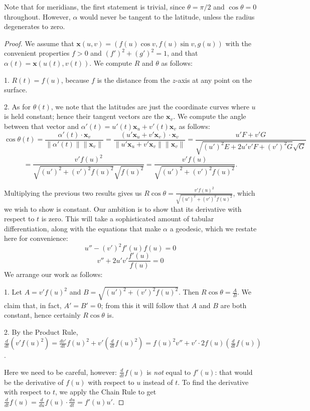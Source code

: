 \documentclass[leqno]{book}
\begin{document}
\noindent Note that for meridians, the first statement is trivial, since $\theta=\pi/2$ and $\cos\theta=0$ throughout.  However, $\alpha$ would never be tangent to the latitude, unless the radius degenerates to zero.
\begin{proof}
We assume that $\mathbf x(u,v)=(f(u)\cos v,f(u)\sin v,g(u))$ with the convenient properties $f>0$ and $(f')^2+(g')^2=1$, and that $\alpha(t)=\mathbf x(u(t),v(t))$.  We compute $R$ and $\theta$ as follows:

1. $R(t)=f(u)$, because $f$ is the distance from the $z$-axis at any point on the surface.

2. As for $\theta(t)$, we note that the latitudes are just the coordinate curves where $u$ is held constant; hence their tangent vectors are the $\mathbf x_v$.  We compute the angle between that vector and $\alpha'(t)=u'(t)\mathbf x_u+v'(t)\mathbf x_v$ as follows:
$$\cos\theta(t)=\frac{\alpha'(t)\cdot\mathbf x_v}{\|\alpha'(t)\|\|\mathbf x_v\|}=\frac{(u'\mathbf x_u+v'\mathbf x_v)\cdot\mathbf x_v}{\|u'\mathbf x_u+v'\mathbf x_v\|\|\mathbf x_v\|}=\frac{u'F+v'G}{\sqrt{(u')^2E+2u'v'F+(v')^2G}\sqrt G}$$
$$=\frac{v'f(u)^2}{\sqrt{(u')^2+(v')^2f(u)^2}\sqrt{f(u)^2}}=\frac{v'f(u)}{\sqrt{(u')^2+(v')^2f(u)^2}}.$$

Multiplying the previous two results gives us $R\cos\theta=\frac{v'f(u)^2}{\sqrt{(u')^2+(v')^2f(u)^2}}$, which we wish to show is constant.  Our ambition is to show that its derivative with respect to $t$ is zero.  This will take a sophisticated amount of tabular differentiation, along with the equations that make $\alpha$ a geodesic, which we restate here for convenience:
$$u''-(v')^2f'(u)f(u)=0$$
$$v''+2u'v'\frac{f'(u)}{f(u)}=0$$
We arrange our work as follows:

1. Let $A=v'f(u)^2$ and $B=\sqrt{(u')^2+(v')^2f(u)^2}$.  Then $R\cos\theta=\frac AB$.  We claim that, in fact, $A'=B'=0$; from this it will follow that $A$ and $B$ are both constant, hence certainly $R\cos\theta$ is.

2. By the Product Rule, $\frac{d}{dt}(v'f(u)^2)=\frac{dv'}{dt}f(u)^2+v'\left(\frac{d}{dt}f(u)^2\right)=f(u)^2v''+v'\cdot 2f(u)\left(\frac{d}{dt}f(u)\right)$.

Here we need to be careful, however: $\frac{d}{dt}f(u)$ is \emph{not} equal to $f'(u)$: that would be the derivative of $f(u)$ with respect to $u$ instead of $t$.  To find the derivative with respect to $t$, we apply the Chain Rule to get $\frac{d}{dt}f(u)=\frac{d}{du}f(u)\cdot\frac{du}{dt}=f'(u)u'$.


\end{proof}
\end{document}
